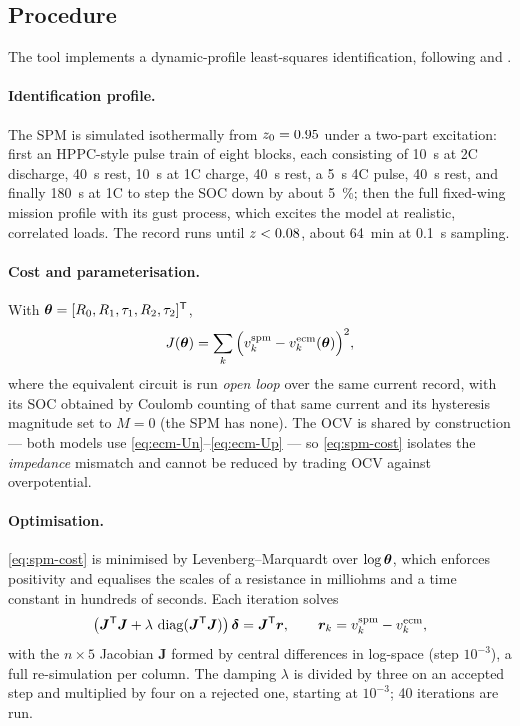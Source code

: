 \subsection{Procedure}
The tool  implements a dynamic-profile least-squares
identification, following \cite[Ch.~2]{plett2015bms1} and
\cite{hu2012comparative,ljung1999}.

\paragraph{Identification profile.} The SPM is simulated isothermally from
$z_0 = 0.95$ under a two-part excitation: first an HPPC-style pulse train of eight blocks,
each consisting of \SI{10}{\second} at 2C discharge, \SI{40}{\second} rest, \SI{10}{\second} at
1C charge, \SI{40}{\second} rest, a \SI{5}{\second} 4C pulse, \SI{40}{\second} rest, and finally
\SI{180}{\second} at 1C to step the SOC down by about \SI{5}{\percent}; then the full fixed-wing
mission profile with its gust process, which excites the model at realistic, correlated loads.
The record runs until $z<0.08$, about \SI{64}{\minute} at \SI{0.1}{\second} sampling.

\paragraph{Cost and parameterisation.} With $\bm{\theta} = [R_0, R_1, \tau_1, R_2, \tau_2]^{\mathsf{T}}$,
\begin{equation}
J(\bm{\theta}) = \sum_{k}\Big(v^{\mathrm{spm}}_k - v^{\mathrm{ecm}}_k(\bm{\theta})\Big)^2,
\label{eq:spm-cost}
\end{equation}
where the equivalent circuit is run \emph{open loop} over the same current record, with its SOC
obtained by Coulomb counting of that same current and its hysteresis magnitude set to
$M=0$ (the SPM has none). The OCV is shared by construction --- both models use
\eqref{eq:ecm-Un}--\eqref{eq:ecm-Up} --- so \eqref{eq:spm-cost} isolates the \emph{impedance}
mismatch and cannot be reduced by trading OCV against overpotential.

\paragraph{Optimisation.} \eqref{eq:spm-cost} is minimised by Levenberg--Marquardt
\cite{levenberg1944,marquardt1963}\cite[Ch.~10]{nocedal2006} over $\log\bm{\theta}$, which enforces
positivity and equalises the scales of a resistance in milliohms and a time constant in hundreds
of seconds. Each iteration solves
\begin{equation}
\left(\bm{J}^{\mathsf{T}}\bm{J} + \lambda\,\operatorname{diag}(\bm{J}^{\mathsf{T}}\bm{J})\right)\bm{\delta}
 = \bm{J}^{\mathsf{T}}\bm{r},
\qquad \bm{r}_k = v^{\mathrm{spm}}_k - v^{\mathrm{ecm}}_k,
\label{eq:spm-lm}
\end{equation}
with the $n\times 5$ Jacobian $\bm{J}$ formed by central differences in log-space (step
$10^{-3}$), a full re-simulation per column. The damping $\lambda$ is divided by three on an
accepted step and multiplied by four on a rejected one, starting at $10^{-3}$; 40 iterations are
run.

